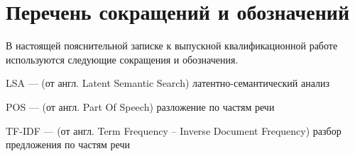 \documentclass[../main]{subfiles}
\begin{document}
\newpage
{}
{}
\section*{Перечень сокращений и обозначений}

В настоящей пояснительной записке к выпускной квалификационной
работе используются следующие сокращения и обозначения.

\begin{termenum}
    \item LSA --- (от англ. Latent Semantic Search) латентно-семантический анализ
    \item POS --- (от англ. Part Of Speech) разложение по частям речи
    \item TF-IDF --- (от англ. Term Frequency -- Inverse Document Frequency) разбор предложения по частям речи
\end{termenum}
\end{document}
